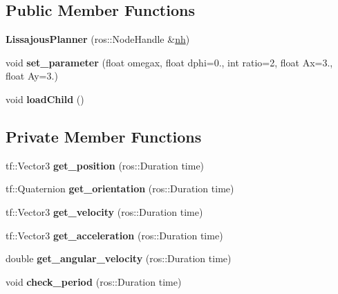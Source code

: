 \subsection*{Public Member Functions}
\begin{DoxyCompactItemize}
\item 
{\bfseries Lissajous\+Planner} (ros\+::\+Node\+Handle \&\hyperlink{classPlanner_a9714d036f444a07ce90be8d135b9a40c}{nh})\hypertarget{classLissajousPlanner_a82095ebb2cd29944a201321377fc78fe}{}\label{classLissajousPlanner_a82095ebb2cd29944a201321377fc78fe}

\item 
void {\bfseries set\+\_\+parameter} (float omegax, float dphi=0., int ratio=2, float Ax=3., float Ay=3.)\hypertarget{classLissajousPlanner_aa6e4d941a535dca182aaf8b73b5a0dcd}{}\label{classLissajousPlanner_aa6e4d941a535dca182aaf8b73b5a0dcd}

\item 
void {\bfseries load\+Child} ()\hypertarget{classLissajousPlanner_a09e5a547d33d13fbf4a27fdf0ba91b57}{}\label{classLissajousPlanner_a09e5a547d33d13fbf4a27fdf0ba91b57}

\end{DoxyCompactItemize}
\subsection*{Private Member Functions}
\begin{DoxyCompactItemize}
\item 
tf\+::\+Vector3 {\bfseries get\+\_\+position} (ros\+::\+Duration time)\hypertarget{classLissajousPlanner_aeb9a2e0f3cb8e651518bcd0dcd80bf2f}{}\label{classLissajousPlanner_aeb9a2e0f3cb8e651518bcd0dcd80bf2f}

\item 
tf\+::\+Quaternion {\bfseries get\+\_\+orientation} (ros\+::\+Duration time)\hypertarget{classLissajousPlanner_a07eb5dc306609dd6ae1f91e2738aee95}{}\label{classLissajousPlanner_a07eb5dc306609dd6ae1f91e2738aee95}

\item 
tf\+::\+Vector3 {\bfseries get\+\_\+velocity} (ros\+::\+Duration time)\hypertarget{classLissajousPlanner_a17a85db0fe0f380164297b8365232ab2}{}\label{classLissajousPlanner_a17a85db0fe0f380164297b8365232ab2}

\item 
tf\+::\+Vector3 {\bfseries get\+\_\+acceleration} (ros\+::\+Duration time)\hypertarget{classLissajousPlanner_ad9bba0ec2a356f43bd76e64a8dd2b464}{}\label{classLissajousPlanner_ad9bba0ec2a356f43bd76e64a8dd2b464}

\item 
double {\bfseries get\+\_\+angular\+\_\+velocity} (ros\+::\+Duration time)\hypertarget{classLissajousPlanner_ab7ef88484995f3fd223c8dcbd6f86a8e}{}\label{classLissajousPlanner_ab7ef88484995f3fd223c8dcbd6f86a8e}

\item 
void {\bfseries check\+\_\+period} (ros\+::\+Duration time)\hypertarget{classLissajousPlanner_a9001fcfa7f1d25e4ae7826499b0b2ebc}{}\label{classLissajousPlanner_a9001fcfa7f1d25e4ae7826499b0b2ebc}

\end{DoxyCompactItemize}

